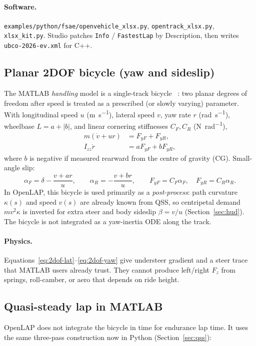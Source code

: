 \documentclass[11pt,letterpaper]{article}
\newcommand{\eng}[1]{\paragraph{Physics.} #1}
\newcommand{\codepath}[1]{\paragraph{Software.} #1}
\begin{document}
\codepath{\texttt{examples/python/fsae/openvehicle\_xlsx.py},
\texttt{opentrack\_xlsx.py}, \texttt{xlsx\_kit.py}. Studio patches
\texttt{Info} / \texttt{FastestLap} by Description, then writes
\texttt{ubco-2026-ev.xml} for C++.}

\subsection{Planar 2DOF bicycle (yaw and sideslip)}
\label{sec:2dof-bicycle}

The MATLAB \emph{handling} model is a single-track bicycle
~\cite{gillespie,milliken}: two planar degrees of freedom after speed
is treated as a prescribed (or slowly varying) parameter. With
longitudinal speed $u$ (\si{\metre\per\second}), lateral speed $v$,
yaw rate $r$ (\si{\radian\per\second}), wheelbase $L=a+|b|$, and linear
cornering stiffnesses $C_F,C_R$ (\si{\newton\per\radian}),
\begin{align}
  m(\dot v + u r) &= F_{yF} + F_{yR}, \label{eq:2dof-lat}\\
  I_{zz}\dot r &= a F_{yF} + b F_{yR}, \label{eq:2dof-yaw}
\end{align}
where $b$ is negative if measured rearward from the centre of gravity
(CG). Small-angle slip:
\begin{equation}
  \alpha_F = \delta - \frac{v + a r}{u},\qquad
  \alpha_R = -\frac{v + b r}{u},\qquad
  F_{yF}=C_F\alpha_F,\quad F_{yR}=C_R\alpha_R.
\end{equation}
In OpenLAP, this bicycle is used primarily as a \emph{post-process}:
path curvature $\kappa(s)$ and speed $v(s)$ are already known from QSS,
so centripetal demand $m v^2\kappa$ is inverted for extra steer and
body sideslip $\beta=v/u$ (Section~\ref{sec:hud}). The bicycle is not
integrated as a yaw-inertia ODE along the track.

\eng{Equations~\eqref{eq:2dof-lat}--\eqref{eq:2dof-yaw} give
understeer gradient and a steer trace that MATLAB users already trust.
They cannot produce left/right $F_z$ from springs, roll-camber, or
aero that depends on ride height.}

\subsection{Quasi-steady lap in MATLAB}
\label{sec:matlab-qss}

OpenLAP does not integrate the bicycle in time for endurance lap time.
It uses the same three-pass construction now in Python
(Section~\ref{sec:qss}):
\end{document}
